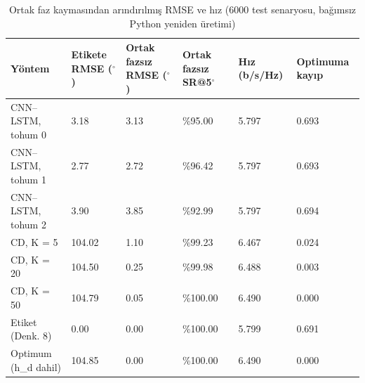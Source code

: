 \begin{table}[t]
\centering
\caption{Ortak faz kaymasından arındırılmış RMSE ve hız (6000 test senaryosu, bağımsız Python yeniden üretimi)}
\begin{tabular}{llllll}
\toprule
Yöntem & Etikete RMSE ($^\circ$) & Ortak fazsız RMSE ($^\circ$) & Ortak fazsız SR@5$^\circ$ & Hız (b/s/Hz) & Optimuma kayıp \\
\midrule
CNN–LSTM, tohum 0 & 3.18 & 3.13 & \%95.00 & 5.797 & 0.693 \\
CNN–LSTM, tohum 1 & 2.77 & 2.72 & \%96.42 & 5.797 & 0.693 \\
CNN–LSTM, tohum 2 & 3.90 & 3.85 & \%92.99 & 5.797 & 0.694 \\
CD, K = 5 & 104.02 & 1.10 & \%99.23 & 6.467 & 0.024 \\
CD, K = 20 & 104.50 & 0.25 & \%99.98 & 6.488 & 0.003 \\
CD, K = 50 & 104.79 & 0.05 & \%100.00 & 6.490 & 0.000 \\
Etiket (Denk. 8) & 0.00 & 0.00 & \%100.00 & 5.799 & 0.691 \\
Optimum (h\_d dahil) & 104.85 & 0.00 & \%100.00 & 6.490 & 0.000 \\
\bottomrule
\end{tabular}
\end{table}
